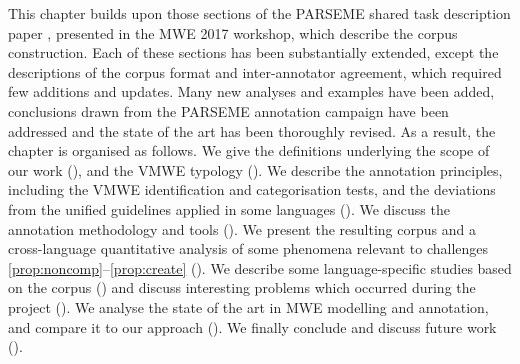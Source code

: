 \documentclass[output=paper,modfonts]{langscibook}
\begin{document}
This chapter builds upon those sections of the PARSEME shared task description paper \citep{MWEWorkshop}, presented in the MWE 2017 workshop, which describe the corpus construction. 
Each of these sections has been substantially extended, except the descriptions of the corpus format and inter-annotator agreement, which required few additions and updates. Many new analyses and examples have been added, conclusions drawn from the PARSEME annotation campaign have been addressed and the state of the art has been thoroughly revised. As a result, the chapter is organised as follows. 
We give the definitions underlying the scope of our work (), and the VMWE typology (). 
We describe the annotation principles, including 
the VMWE identification and categorisation tests, %
and the deviations from the unified guidelines applied in some languages ().
We discuss the annotation methodology and tools (). We present the resulting corpus and a cross-language quantitative analysis of some phenomena relevant to challenges \ref{prop:noncomp}--\ref{prop:create} (). 
We describe some language-specific studies based on the corpus () and discuss interesting problems which occurred during the project ().
We analyse the state of the art in MWE modelling and annotation, and compare it to our approach (). We finally conclude and discuss future work ().   


\end{document}
